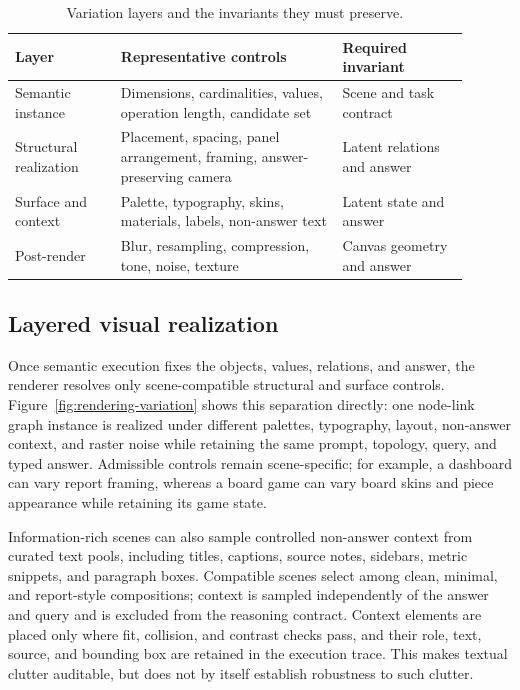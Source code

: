 \begin{table}[h]
  \centering
  \small
  \setlength{\tabcolsep}{4pt}
  \renewcommand{\arraystretch}{1.12}
  \caption{Variation layers and the invariants they must preserve.}
  \label{tab:variation-layers}
  \begin{tabular}{@{}p{0.21\linewidth}p{0.44\linewidth}p{0.25\linewidth}@{}}
    \toprule
    Layer & Representative controls & Required invariant \\
    \midrule
    Semantic instance
      & Dimensions, cardinalities, values, operation length, candidate set
      & Scene and task contract \\
    Structural realization
      & Placement, spacing, panel arrangement, framing, answer-preserving camera
      & Latent relations and answer \\
    Surface and context
      & Palette, typography, skins, materials, labels, non-answer text
      & Latent state and answer \\
    Post-render
      & Blur, resampling, compression, tone, noise, texture
      & Canvas geometry and answer \\
    \bottomrule
  \end{tabular}
\end{table}

\subsection{Layered visual realization}

Once semantic execution fixes the objects, values, relations, and answer, the
renderer resolves only scene-compatible structural and surface controls.
Figure~\ref{fig:rendering-variation} shows this separation directly: one
node-link graph instance is realized under different palettes, typography,
layout, non-answer context, and raster noise while retaining the same prompt,
topology, query, and typed answer. Admissible controls remain scene-specific; for
example, a dashboard can vary report framing, whereas a board game can vary
board skins and piece appearance while retaining its game state.

Information-rich scenes can also sample controlled non-answer context from
curated text pools, including titles, captions, source notes, sidebars, metric
snippets, and paragraph boxes. Compatible scenes select among clean, minimal,
and report-style compositions; context is sampled independently of the answer
and query and is excluded from the reasoning contract. Context elements are
placed only where fit, collision, and contrast checks pass, and their role,
text, source, and bounding box are retained in the execution trace. This makes
textual clutter auditable, but does not by itself establish robustness to such
clutter.

